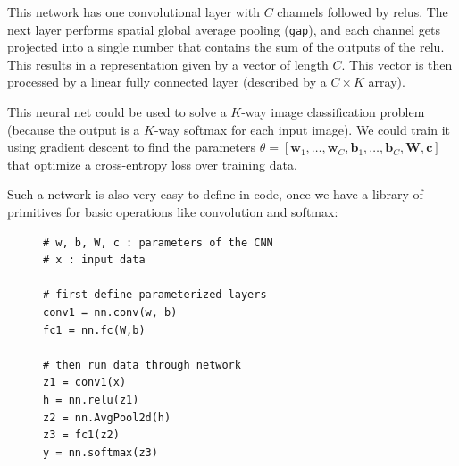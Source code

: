 This network has one convolutional layer with $C$ channels followed by relus. The next layer performs spatial global average pooling (\texttt{gap}), and each channel gets projected into a single number that contains the sum of the outputs of the relu. This results in a representation given by a vector of length $C$. This vector is then processed by a linear fully connected layer (described by a $C \times K$ array).

This neural net could be used to solve a $K$-way image classification problem (because the output is a $K$-way softmax for each input image). We could train it using gradient descent to find the parameters $\theta = [\mathbf{w}_1, \ldots, \mathbf{w}_C, \mathbf{b}_1, \ldots, \mathbf{b}_C, \mathbf{W}, \mathbf{c}]$ that optimize a cross-entropy loss over training data.




Such a network is also very easy to define in code, once we have a library of primitives for basic operations like convolution and softmax:

\begin{figure}[h]
\begin{minipage}{1.0\linewidth}
\begin{verbatim}
# w, b, W, c : parameters of the CNN
# x : input data

# first define parameterized layers
conv1 = nn.conv(w, b)
fc1 = nn.fc(W,b)

# then run data through network
z1 = conv1(x)
h = nn.relu(z1)
z2 = nn.AvgPool2d(h)
z3 = fc1(z2)
y = nn.softmax(z3)
\end{verbatim}
\end{minipage}
\end{figure}


